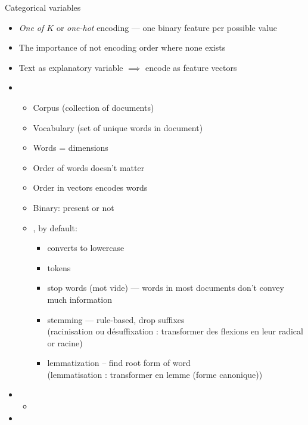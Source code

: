 




Categorical variables
\begin{itemize}
\item \textit{One of $K$ } or \textit{one-hot} encoding --- one binary feature per possible value
\item The importance of not encoding order where none exists
\item Text as explanatory variable $\implies$ encode as feature vectors
\item {}
  \begin{itemize}
  \item Corpus (collection of documents)
  \item Vocabulary (set of unique words in document)
  \item Words = dimensions
  \item Order of words doesn't matter
  \item Order in vectors encodes words
  \item Binary: present or not
  \item {}, by default:
    \begin{itemize}
    \item converts to lowercase
    \item tokens
    \item stop words (mot vide) --- words in most documents don't convey much information
    \item stemming --- rule-based, drop suffixes\\
      (racinisation ou désuffixation : transformer des flexions en leur radical or racine)
    \item lemmatization -- find root form of word\\
      (lemmatisation : transformer en lemme (forme canonique))
    \end{itemize}
  \end{itemize}
\item {}
  \begin{itemize}
  \item 
  \end{itemize}


\item 
\end{itemize}


